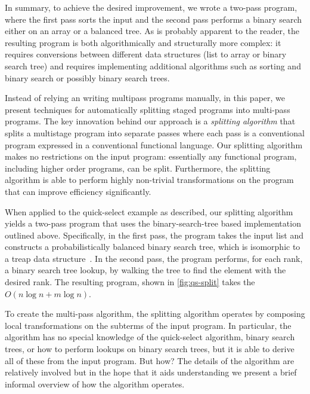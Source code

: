 \begin{abstrsyn}
In summary, to achieve the desired improvement, we wrote a two-pass
program, where the first pass sorts the input and the second pass
performs a binary search either on an array or a balanced tree. As is
probably apparent to the reader, the resulting program is both
algorithmically and structurally more complex: it requires conversions
between different data structures (list to array or binary search
tree) and requires implementing additional algorithms such as sorting
and binary search or possibly binary search trees.  



Instead of relying an writing multipass programs manually, in this
paper, we present techniques for automatically splitting staged
programs into multi-pass programs.  The key innovation behind our
approach is a {\em splitting algorithm} that splits a multistage
program into separate passes where each pass is a conventional program
expressed in a conventional functional language.  Our splitting
algorithm makes no restrictions on the input program: essentially any
functional program, including higher order programs, can be split.
Furthermore, the splitting algorithm is able to perform highly
non-trivial transformations on the program that can improve efficiency
significantly. 

When applied to the quick-select example as described, our splitting
algorithm yields a two-pass program that uses the binary-search-tree
based implementation outlined above.  Specifically, in the first pass,
the program takes the input list and constructs a probabilistically
balanced binary search tree, which is isomorphic to a treap data
structure~\cite{treaps}.  In the second pass, the program performs,
for each rank, a binary search tree lookup, by walking the tree to
find the element with the desired rank.  The resulting program, shown
in \ref{fig:qs-split}  takes the $O(n\log{n} + m\log{n})$.

To create the multi-pass algorithm, the splitting algorithm operates
by composing local transformations on the subterms of the input
program.  In particular, the algorithm has no special knowledge of the
quick-select algorithm, binary search trees, or how to perform lookups
on binary search trees, but it is able to derive all of these from the
input program.  But how?
%
The details of the algorithm are relatively involved but in the hope
that it aids understanding we present a brief informal overview of how
the algorithm operates.  
%
%



\end{abstrsyn}
